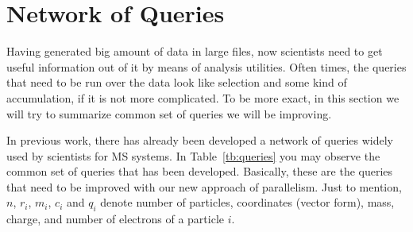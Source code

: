 \documentclass[11pt,a4paper]{report}
\begin{document}
\chapter{Network of Queries}\label{sc:querynetwork}
Having generated big amount of data in large files, now scientists need to get useful information out of it by means of analysis utilities. Often times, the queries that need to be run over the data look like selection and some kind of accumulation, if it is not more complicated. To be more exact, in this section we will try to summarize common set of queries we will be improving. 

In previous work, there has already been developed a network of queries widely used by scientists for MS systems. In Table~\ref{tb:queries} you may observe the common set of queries that has been developed. Basically, these are the queries that need to be improved with our new approach of parallelism. Just to mention, $n$, $r_i$, $m_i$, $c_i$ and $q_i$ denote number of particles, coordinates (vector form), mass, charge, and number of electrons of a particle $i$.
\end{document}
